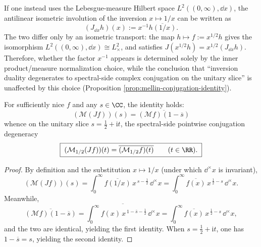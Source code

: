 \begin{remark}\label{rem:mellin-inversion-jacobian}
If one instead uses the Lebesgue-measure Hilbert space \(L^{2}((0,\infty),\dd x)\), the antilinear isometric involution of the inversion \(x\mapsto 1/x\) can be written as
\[
(J_{\dd x}h)(x):=x^{-1}\overline{h(1/x)}.
\]
The two differ only by an isometric transport: the map \(h\mapsto f:=x^{1/2}h\) gives the isomorphism \(L^{2}((0,\infty),\dd x)\cong L^{2}_{\times}\), and satisfies
\(
J(x^{1/2}h)=x^{1/2}(J_{\dd x}h)
\).
Therefore, whether the factor \(x^{-1}\) appears is determined solely by the inner product/measure normalization choice, while the conclusion that ``inversion duality degenerates to spectral-side complex conjugation on the unitary slice'' is unaffected by this choice (Proposition \ref{prop:mellin-conjugation-identity}).
\end{remark}

\begin{proposition}\label{prop:mellin-conjugation-identity}
For sufficiently nice \(f\) and any \(s\in\CC\), the identity holds:
\[
\boxed{\;(\mathcal{M}(Jf))(s)=\overline{(\mathcal{M}f)(1-\overline{s})}\;}
\]
whence on the unitary slice \(s=\tfrac12+\mathrm{i}t\), the spectral-side pointwise conjugation degeneracy
\[
\boxed{\;(\mathcal{M}_{1/2}(Jf))(t)=\overline{(\mathcal{M}_{1/2}f)(t)}\qquad(t\in\RR).\;}
\]
\end{proposition}

\begin{proof}
By definition and the substitution \(x\mapsto 1/x\) (under which \(\dd^{\times}x\) is invariant),
\[
(\mathcal{M}(Jf))(s)
=\int_{0}^{\infty}\overline{f(1/x)}\,x^{\,s-\frac12}\,\dd^{\times}x
=\int_{0}^{\infty}\overline{f(x)}\,x^{\,\frac12-s}\,\dd^{\times}x.
\]
Meanwhile,
\[
\overline{(\mathcal{M}f)(1-\overline{s})}
=\overline{\int_{0}^{\infty} f(x)\,x^{\,1-\overline{s}-\frac12}\,\dd^{\times}x}
=\int_{0}^{\infty}\overline{f(x)}\,x^{\,\frac12-s}\,\dd^{\times}x,
\]
and the two are identical, yielding the first identity.
When \(s=\tfrac12+\mathrm{i}t\), one has \(1-\overline{s}=s\), yielding the second identity. \qedhere
\end{proof}

